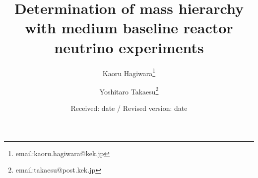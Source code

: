 \title{Determination of mass hierarchy with medium baseline reactor
 neutrino experiments}

\author{Kaoru Hagiwara\fnmsep\thanks{email:kaoru.hagiwara@kek.jp} \and Yoshitaro Takaesu\fnmsep\thanks{email:takaesu@post.kek.jp}
}                     %


%
\date{Received: date / Revised version: date}
%
%
\maketitle
%

